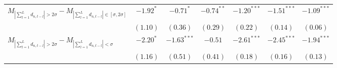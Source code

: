 \begin{tabular}{lcccccc}
  $M_{\left|\sum_{l=1}^L d_{n,t-l}\right| > 2 \sigma}-M_{\left|\sum_{l=1}^L d_{n,t-l}\right| \in [\sigma, 2\sigma]}$ & $-1.92^{*}$ & $-0.71^{*}$ & $-0.74^{**}$ & $-1.20^{***}$ & $-1.51^{***}$ & $-1.09^{***}$ \\ 
   & $(1.10)$ & $(0.36)$ & $(0.29)$ & $(0.22)$ & $(0.14)$ & $(0.06)$ \\ 
  $M_{\left|\sum_{l=1}^L d_{n,t-l}\right| > 2 \sigma}-M_{\left|\sum_{l=1}^L d_{n,t-l}\right| < \sigma}$ & $-2.20^{*}$ & $-1.63^{***}$ & $-0.51$ & $-2.61^{***}$ & $-2.45^{***}$ & $-1.94^{***}$ \\ 
   & $(1.16)$ & $(0.51)$ & $(0.41)$ & $(0.18)$ & $(0.16)$ & $(0.13)$ \\ 
   \hline 
\end{tabular}
